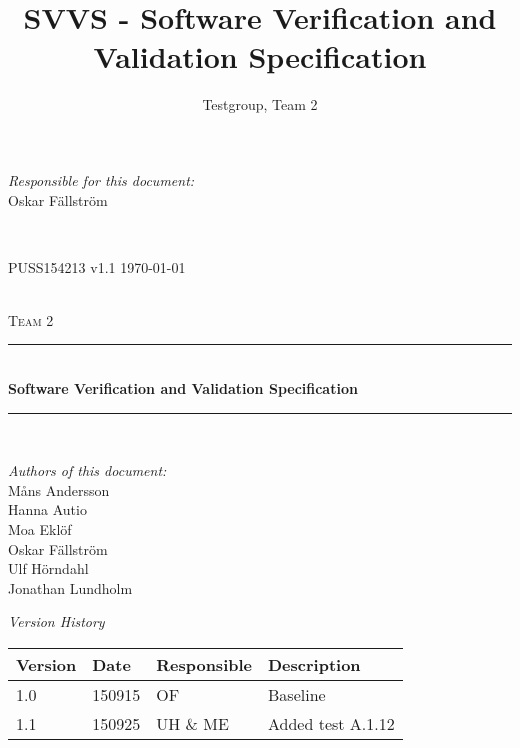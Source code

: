 \documentclass[a4paper]{article}
\title{SVVS - Software Verification and Validation Specification}
\author{Testgroup, Team 2}
\begin{document}
\begin{titlepage}
\newcommand{\HRule}{\rule{\linewidth}{0.5mm}}

\begin{minipage}{0.5\textwidth}
\begin{flushleft} %
\textit{Responsible for this document:}\\
Oskar Fällström %
\end{flushleft}
\end{minipage}
~
\begin{minipage}{0.4\textwidth}
\begin{flushright}
PUSS154213 v1.1 %
\today
\end{flushright}
\end{minipage}\\[3cm]

\centering
\textsc{\LARGE Team 2}\\[0.5cm]

\HRule \\[0.4cm]
{ \huge \bfseries Software Verification and Validation  Specification}\\[0.4cm] %
\HRule \\[1.5cm]

\vfill
\begin{flushleft}
\textit{Authors of this document:}\\
Måns Andersson \\
Hanna Autio \\
Moa Eklöf \\
Oskar Fällström \\
Ulf Hörndahl \\
Jonathan Lundholm
\end{flushleft}


\end{titlepage}

\begin{center}
\textit{\large Version History}

    \begin{tabular}{ | l | l | l | p{5cm} |}
    \hline
    \textbf{Version}	& \textbf{Date}		& \textbf{Responsible}		& \textbf{Description}					\\ \hline
    1.0					& 150915 			& OF						& Baseline								\\ \hline
    1.1					&	150925			&	UH \& ME				&	Added test A.1.12 \\ \hline
    \end{tabular}
\end{center}
\end{document}
